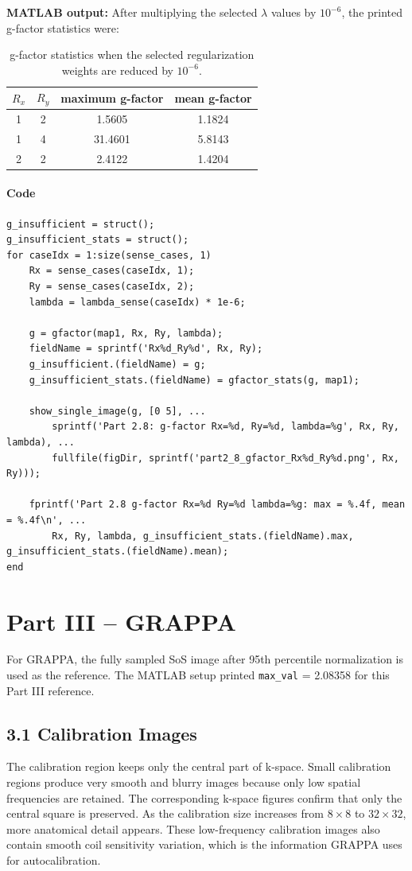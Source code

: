 ﻿\documentclass[11pt]{article}
\begin{document}
\textbf{MATLAB output:} After multiplying the selected $\lambda$ values by $10^{-6}$, the printed g-factor statistics were:
\begin{table}[H]
\centering
\begin{tabular}{c c c c}
\hline
$R_x$ & $R_y$ & maximum g-factor & mean g-factor \\
\hline
1 & 2 & 1.5605 & 1.1824 \\
1 & 4 & 31.4601 & 5.8143 \\
2 & 2 & 2.4122 & 1.4204 \\
\hline
\end{tabular}
\caption{g-factor statistics when the selected regularization weights are reduced by $10^{-6}$.}
\end{table}

\paragraph{Code}
\begin{lstlisting}[style=matlabstyle]
g_insufficient = struct();
g_insufficient_stats = struct();
for caseIdx = 1:size(sense_cases, 1)
    Rx = sense_cases(caseIdx, 1);
    Ry = sense_cases(caseIdx, 2);
    lambda = lambda_sense(caseIdx) * 1e-6;

    g = gfactor(map1, Rx, Ry, lambda);
    fieldName = sprintf('Rx%d_Ry%d', Rx, Ry);
    g_insufficient.(fieldName) = g;
    g_insufficient_stats.(fieldName) = gfactor_stats(g, map1);

    show_single_image(g, [0 5], ...
        sprintf('Part 2.8: g-factor Rx=%d, Ry=%d, lambda=%g', Rx, Ry, lambda), ...
        fullfile(figDir, sprintf('part2_8_gfactor_Rx%d_Ry%d.png', Rx, Ry)));

    fprintf('Part 2.8 g-factor Rx=%d Ry=%d lambda=%g: max = %.4f, mean = %.4f\n', ...
        Rx, Ry, lambda, g_insufficient_stats.(fieldName).max, g_insufficient_stats.(fieldName).mean);
end
\end{lstlisting}

\section*{Part III -- GRAPPA}

For GRAPPA, the fully sampled SoS image after 95th percentile normalization is used as the reference. The MATLAB setup printed \texttt{max\_val} = 2.08358 for this Part III reference.

\subsection*{3.1 Calibration Images}
The calibration region keeps only the central part of k-space. Small calibration regions produce very smooth and blurry images because only low spatial frequencies are retained. The corresponding k-space figures confirm that only the central square is preserved. As the calibration size increases from $8\times8$ to $32\times32$, more anatomical detail appears. These low-frequency calibration images also contain smooth coil sensitivity variation, which is the information GRAPPA uses for autocalibration.
\end{document}
